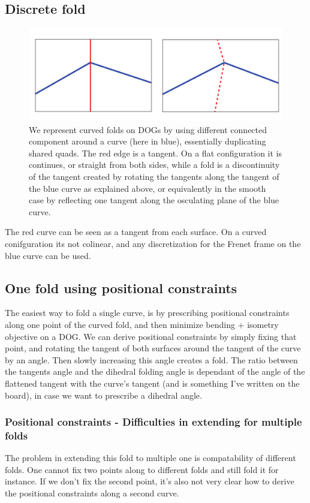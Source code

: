 \documentclass{article}
\theoremstyle{definition}
\begin{document}
\subsection{Discrete fold}

\begin{figure} [h]
	\centering
	\includegraphics[width=\linewidth,height=0.22\linewidth]{folding_an_edge.pdf}
	\caption{We represent curved folds on DOGs by using different connected component around a curve (here in blue), essentially duplicating shared quads. The red edge is a tangent. On a flat configuration it is continues, or straight from both sides, while a fold is a discontinuity of the tangent created by rotating the tangents along the tangent of the blue curve as explained above, or equivalently in the smooth case by reflecting one tangent along the osculating plane of the blue curve.}
	\label{fig:folding_an_edge.pdf}
\end{figure}
The red curve can be seen as a tangent from each surface. On a curved conifguration its not colinear, and any discretization for the Frenet frame on the blue curve can be used.

\subsection{One fold using positional constraints}
The easiest way to fold a single curve, is by prescribing positional constraints along one point  of the curved fold, and then minimize bending + isometry objective on a DOG. We can derive positional constraints by simply fixing that point, and rotating the tangent of both surfaces around the tangent of the curve by an angle. Then slowly increasing this angle creates a fold. The ratio between the tangents angle and the dihedral folding angle is dependant of the angle of the flattened tangent with the curve's tangent (and is something I've written on the board), in case we want to prescribe a dihedral angle.

\subsubsection{Positional constraints - Difficulties in extending for multiple folds}
The problem in extending this fold to multiple one is compatability of different folds. One cannot fix two points along to different folds and still fold it for instance. If we don't fix the second point, it's also not very clear how to derive the positional constraints along a second curve.
\end{document}
